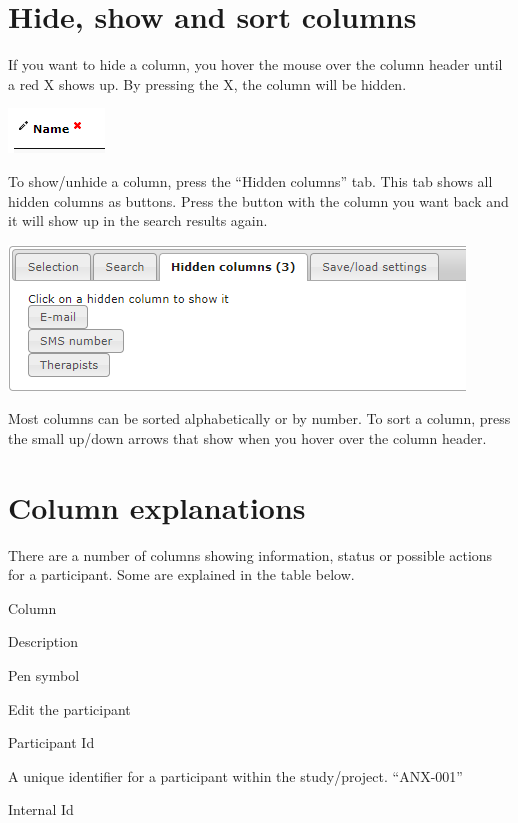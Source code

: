 \documentclass[]{book}
\begin{document}
\hypertarget{hide-show-and-sort-columns}{%
\section{Hide, show and sort columns}\label{hide-show-and-sort-columns}}

If you want to hide a column, you hover the mouse over the column header until a red X shows up. By pressing the X, the column will be hidden.

\includegraphics{images/hide-show-sort.png}

To show/unhide a column, press the ``Hidden columns'' tab. This tab shows all hidden columns as buttons. Press the button with the column you want back and it will show up in the search results again.

\includegraphics{images/hidden-columns.png}

Most columns can be sorted alphabetically or by number. To sort a column, press the small up/down arrows that show when you hover over the column header.

\hypertarget{column-explanations}{%
\section{Column explanations}\label{column-explanations}}

There are a number of columns showing information, status or possible actions for a participant. Some are explained in the table below.

Column

Description

Pen symbol

Edit the participant

Participant Id

A unique identifier for a participant within the study/project. ``ANX-001''

Internal Id
\end{document}
